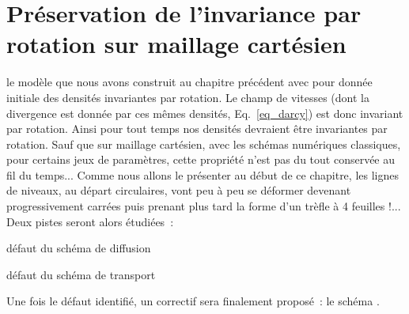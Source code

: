 \documentclass[main.tex]{subfiles}
\begin{document}
\chapter{Préservation de l'invariance par rotation sur maillage cartésien \label{chap:trefle}}

%

 le modèle que nous avons construit au chapitre précédent avec pour donnée initiale des densités invariantes par rotation. Le champ de vitesses (dont la divergence est  donnée par ces mêmes densités, \cf Eq.~\eqref{eq_darcy}) est donc invariant par rotation. Ainsi pour tout temps nos densités devraient être invariantes par rotation. Sauf que sur maillage cartésien, avec les schémas numériques classiques, pour certains jeux de paramètres,  cette propriété n'est pas du tout conservée au fil du temps... Comme nous allons le présenter au début de ce chapitre, les lignes de niveaux, au départ circulaires, vont peu à peu se déformer devenant progressivement carrées puis prenant plus tard la forme d'un trèfle à 4 feuilles !... Deux pistes seront alors étudiées~:
\begin{myitemize}
\item défaut du schéma de diffusion
\item défaut du schéma de transport
\end{myitemize}


\noindent Une fois le défaut identifié, un correctif sera finalement proposé~: le schéma \twinweno. 
\end{document}
